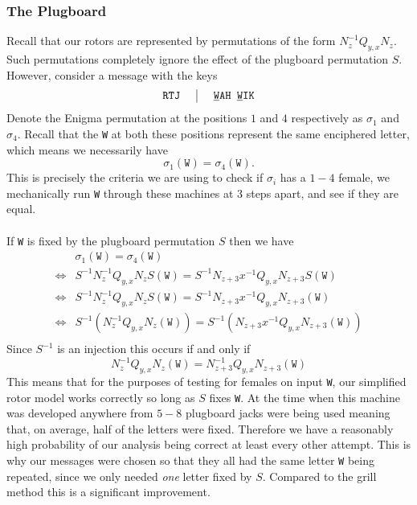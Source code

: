 \subsubsection{The Plugboard}
Recall that our rotors are represented by permutations of the form
$N_{z}^{-1}Q_{y,x}N_{z}$. Such permutations completely ignore the
effect of the plugboard permutation $S$. However, consider a message
with the keys
\[
	\setlength{\arraycolsep}{15pt}
	\begin{array}{c | c}
		\texttt{RTJ} & {\uline{\texttt{W}}}\texttt{AH
		}{\uline{\texttt{W}}}\texttt{IK}              \\
	\end{array}
\]
Denote the Enigma permutation at the positions $1$ and $4$
respectively as $\sigma_1$ and $\sigma_4$. Recall that the \texttt{W}
at both these positions represent the same enciphered letter, which
means we necessarily have
\[
	\sigma_1(\texttt{W}) = \sigma_4(\texttt{W}).
\]
This is precisely the criteria we are using to check if $\sigma_i$
has a $1-4$ female, we mechanically run \texttt{W} through these
machines at 3 steps apart, and see if they are equal.
\\\\If \texttt{W} is fixed by the plugboard permutation $S$ then we have
\begin{align*}
	     & \sigma_1(\texttt{W}) = \sigma_4(\texttt{W})
	\\
	\iff & S^{-1}N_z^{-1}Q_{y,x}N_zS(\texttt{W}) =
	S^{-1}N_{z+3}x^{-1}Q_{y,x}N_{z+3}S(\texttt{W})     \\
	\iff & S^{-1}N_z^{-1}Q_{y,x}N_zS(\texttt{W}) =
	S^{-1}N_{z+3}x^{-1}Q_{y,x}N_{z+3}(\texttt{W})      \\
	\iff & S^{-1}(N_z^{-1}Q_{y,x}N_z(\texttt{W})) =
	S^{-1}(N_{z+3}x^{-1}Q_{y,x}N_{z+3}(\texttt{W}))    \\
\end{align*}
Since $S^{-1}$ is an injection this occurs if and only if
\[
	N_z^{-1}Q_{y,x}N_z(\texttt{W}) = N_{z+3}^{-1}Q_{y,x}N_{z+3}(\texttt{W})
\]
This means that for the purposes of testing for females on input
\texttt{W}, our simplified rotor model works correctly so long as $S$
fixes \texttt{W}. At the time when this machine was developed
anywhere from $5-8$ plugboard jacks were being used meaning that, on
average, half of the letters were fixed. Therefore we have a
reasonably high probability of our analysis being correct at least
every other attempt. This is why our messages were chosen so that
they all had the same letter \texttt{W} being repeated, since we only
needed \emph{one} letter fixed by $S$. Compared to the grill method
this is a significant improvement.

